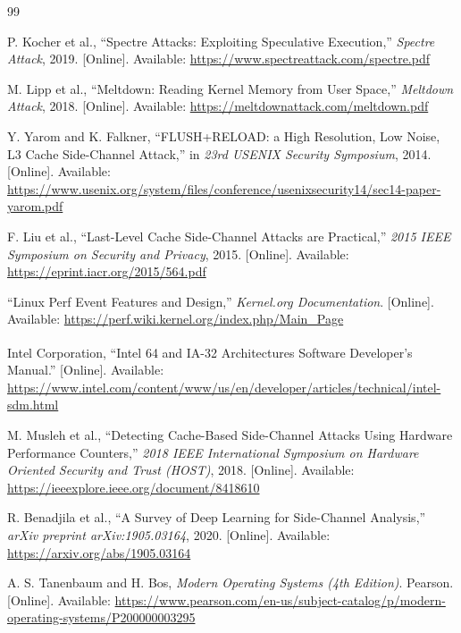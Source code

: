 \documentclass[conference]{IEEEtran}
\begin{document}
\begin{thebibliography}{99}

P. Kocher et al., ``Spectre Attacks: Exploiting Speculative Execution,'' \emph{Spectre Attack}, 2019. [Online]. Available: \url{https://www.spectreattack.com/spectre.pdf}

M. Lipp et al., ``Meltdown: Reading Kernel Memory from User Space,'' \emph{Meltdown Attack}, 2018. [Online]. Available: \url{https://meltdownattack.com/meltdown.pdf}

Y. Yarom and K. Falkner, ``FLUSH+RELOAD: a High Resolution, Low Noise, L3 Cache Side-Channel Attack,'' in \emph{23rd USENIX Security Symposium}, 2014. [Online]. Available: \url{https://www.usenix.org/system/files/conference/usenixsecurity14/sec14-paper-yarom.pdf}

F. Liu et al., ``Last-Level Cache Side-Channel Attacks are Practical,'' \emph{2015 IEEE Symposium on Security and Privacy}, 2015. [Online]. Available: \url{https://eprint.iacr.org/2015/564.pdf}

``Linux Perf Event Features and Design,'' \emph{Kernel.org Documentation}. [Online]. Available: \url{https://perf.wiki.kernel.org/index.php/Main_Page}

Intel Corporation, ``Intel\textsuperscript{\tiny\textregistered} 64 and IA-32 Architectures Software Developer’s Manual.'' [Online]. Available: \url{https://www.intel.com/content/www/us/en/developer/articles/technical/intel-sdm.html}

M. Musleh et al., ``Detecting Cache-Based Side-Channel Attacks Using Hardware Performance Counters,'' \emph{2018 IEEE International Symposium on Hardware Oriented Security and Trust (HOST)}, 2018. [Online]. Available: \url{https://ieeexplore.ieee.org/document/8418610}

R. Benadjila et al., ``A Survey of Deep Learning for Side-Channel Analysis,'' \emph{arXiv preprint arXiv:1905.03164}, 2020. [Online]. Available: \url{https://arxiv.org/abs/1905.03164}

A. S. Tanenbaum and H. Bos, \emph{Modern Operating Systems (4th Edition)}. Pearson. [Online]. Available: \url{https://www.pearson.com/en-us/subject-catalog/p/modern-operating-systems/P200000003295}

\end{thebibliography}
\end{document}
